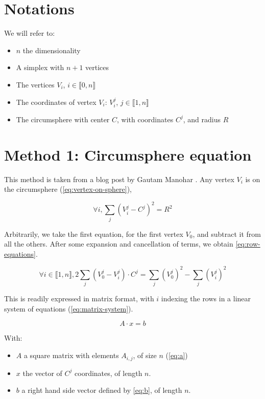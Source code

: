 \section{Notations}
We will refer to:
\begin{itemize}
\item $n$ the dimensionality
\item A simplex with $n+1$ vertices
\item The vertices $V_i$, $i\in \llbracket 0, n \rrbracket$
\item The coordinates of vertex $V_i$: $V_i^j$, $j\in\llbracket 1, n \rrbracket$
\item The circumsphere with center $C$, with coordinates $C^j$, and radius $R$
\end{itemize}

\section{Method 1: Circumsphere equation}
This method is taken from a blog post by Gautam Manohar \cite{Gautam:2019}.
Any vertex $V_i$ is on the circumsphere (\cref{eq:vertex-on-sphere}),

\begin{equation} \label{eq:vertex-on-sphere}
\forall i, \sum_j \left( V_i^j - C^j \right)^2 = R^2
\end{equation}

Arbitrarily, we take the first equation, for the first vertex $V_{0}$, and
subtract it from all the others. After some expansion and cancellation of terms,
we obtain \cref{eq:row-equations}.

\begin{equation} \label{eq:row-equations}
\forall i \in \llbracket 1, n \rrbracket,
2 \sum_j \left( V_0^j - V_i^j \right) \cdot C^j =
  \sum_j \left( V_0^j \right)^2 - \sum_j \left( V_i^j \right)^2
\end{equation}

This is readily expressed in matrix format, with $i$ indexing the rows
in a linear system of equations (\cref{eq:matrix-system}).

\begin{equation} \label{eq:matrix-system}
A \cdot x = b
\end{equation}

With:
\begin{itemize}
\item $A$ a square matrix with elements $A_{i,j}$, of size $n$ (\cref{eq:a})
\item $x$ the vector of $C^j$ coordinates, of length $n$.
\item $b$ a right hand side vector defined by \cref{eq:b}, of length $n$.
\end{itemize}

